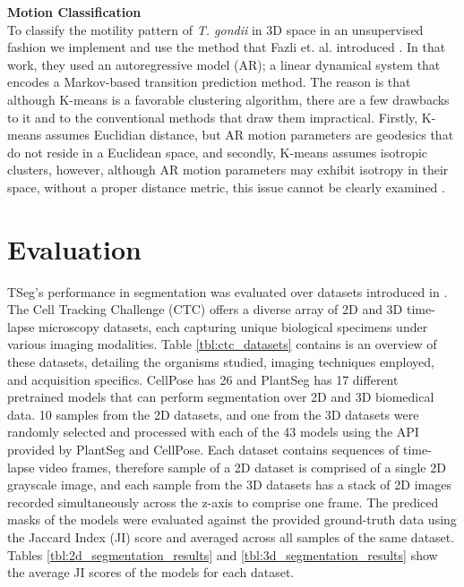 \documentclass[./dissertation.tex]{subfiles}
\begin{document}
\textbf{Motion Classification} \\
To classify the motility pattern of \textit{T. gondii} in 3D space in an unsupervised fashion we implement and use the method that Fazli et. al. introduced \cite{fazli2019lightweight}. In that work, they used an autoregressive model (AR); a linear dynamical system that encodes a Markov-based transition prediction method. The reason is that although K-means is a favorable clustering algorithm, there are a few drawbacks to it and to the conventional methods that draw them impractical. Firstly, K-means assumes Euclidian distance, but AR motion parameters are geodesics that do not reside in a Euclidean space, and secondly, K-means assumes isotropic clusters, however, although AR motion parameters may exhibit isotropy in their space, without a proper distance metric, this issue cannot be clearly examined \cite{fazli2019lightweight}.


\section{Evaluation}
TSeg's performance in segmentation was evaluated over datasets introduced in \cite{mavska2023cell}. The Cell Tracking Challenge (CTC) offers a diverse array of 2D and 3D time-lapse microscopy datasets, each capturing unique biological specimens under various imaging modalities. Table \ref{tbl:ctc_datasets} contains is an overview of these datasets, detailing the organisms studied, imaging techniques employed, and acquisition specifics. CellPose has 26 and PlantSeg has 17 different pretrained models that can perform segmentation over 2D and 3D biomedical data. 10 samples from the 2D datasets, and one from the 3D datasets were randomly selected and processed with each of the 43 models using the API provided by PlantSeg and CellPose. Each dataset contains sequences of time-lapse video frames, therefore sample of a 2D dataset is comprised of a single 2D grayscale image, and each sample from the 3D datasets has a stack of 2D images recorded simultaneously across the z-axis to comprise one frame. The prediced masks of the models were evaluated against the provided ground-truth data using the Jaccard Index (JI) score and averaged across all samples of the same dataset. Tables \ref{tbl:2d_segmentation_results} and \ref{tbl:3d_segmentation_results} show the average JI scores of the models for each dataset.
\end{document}
